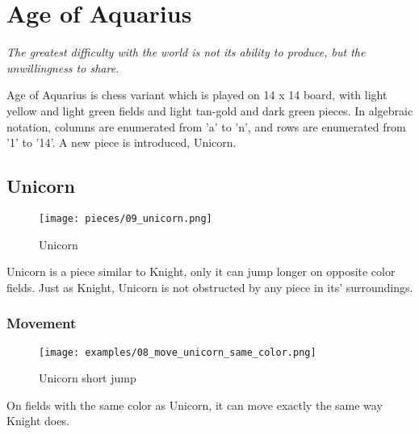 
\chapter*{Age of Aquarius}

\begin{flushright}
\parbox{0.8\textwidth}{
\emph{The greatest difficulty with the world is not its ability to produce, but the unwillingness to share. \\
 } }
\end{flushright}

\noindent
Age of Aquarius is chess variant which is played on 14 x 14 board,
with light yellow and light green fields and light tan-gold and
dark green pieces. In algebraic notation, columns are enumerated
from 'a' to 'n', and rows are enumerated from '1' to '14'. A new
piece is introduced, Unicorn.

\clearpage %

\section*{Unicorn}

\noindent
\begin{wrapfigure}[5]{l}{0.4\textwidth}
\centering
\texttt{[image: pieces/09\_unicorn.png]}
\caption{Unicorn}
\label{fig:09_unicorn}
\end{wrapfigure}
Unicorn is a piece similar to Knight, only it can jump longer on
opposite color fields. Just as Knight, Unicorn is not obstructed
by any piece in its' surroundings.

\vspace{7\baselineskip}
\subsection*{Movement}

\noindent
\begin{wrapfigure}{l}{0.4\textwidth}
\centering
\texttt{[image: examples/08\_move\_unicorn\_same\_color.png]}
\caption{Unicorn short jump}
\label{fig:08_move_unicorn_same_color}
\end{wrapfigure}
On fields with the same color as Unicorn, it can move exactly the
same way Knight does.

